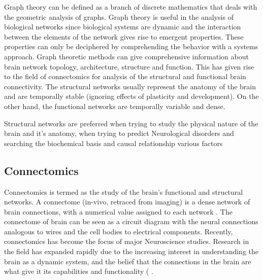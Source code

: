 \documentclass[msthesis.tex]{subfiles}
\begin{document}
Graph theory can be defined as a branch of discrete mathematics that deals with the geometric analysis of graphs. Graph theory is useful in the analysis of biological networks since biological systems are dynamic and the interaction between the elements of the network gives rise to emergent properties. These properties can only be deciphered by comprehending the behavior with a systems approach. Graph theoretic methods can give comprehensive information about brain network topology, architecture, structure and function. This has given rise to the field of connectomics \citep{sporns2005human} for analysis of the structural and functional brain connectivity. The structural networks usually represent the anatomy of the brain and are temporally stable (ignoring effects of plasticity and development). On the other hand, the functional networks are temporally variable and dense.

Structural networks are preferred when trying to study the physical nature of the brain and it's anatomy, when trying to predict Neurological disorders and searching the biochemical basis and causal relationship various factors

\subsection{Connectomics}
\label{sec:connectomics}
Connectomics is termed as the study of the brain's functional and structural networks. A connectome (in-vivo, retraced from imaging) is a dense network of brain connections, with a numerical value assigned to each network \citep{bassett2017network}. The connectome of brain can be seen as a circuit diagram with the neural connections analogous to wires and the cell bodies to electrical components.
Recently, connectomics has become the focus of major Neuroscience studies. Research in the field has expanded rapidly due to the increasing interest in understanding the brain as a dynamic system, and the belief that the connections in the brain are what give it its capabilities and functionality ( \cite{network_neuroscience_editorial}.
\end{document}
